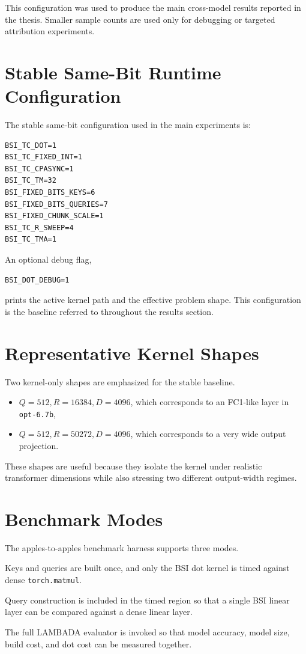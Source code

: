 This configuration was used to produce the main cross-model results reported in the thesis. Smaller sample counts are used only for debugging or targeted attribution experiments.

\section{Stable Same-Bit Runtime Configuration}
The stable same-bit configuration used in the main experiments is:

\begin{verbatim}
BSI_TC_DOT=1
BSI_TC_FIXED_INT=1
BSI_TC_CPASYNC=1
BSI_TC_TM=32
BSI_FIXED_BITS_KEYS=6
BSI_FIXED_BITS_QUERIES=7
BSI_FIXED_CHUNK_SCALE=1
BSI_TC_R_SWEEP=4
BSI_TC_TMA=1
\end{verbatim}

An optional debug flag,

\begin{verbatim}
BSI_DOT_DEBUG=1
\end{verbatim}

prints the active kernel path and the effective problem shape. This configuration is the baseline referred to throughout the results section.

\section{Representative Kernel Shapes}
Two kernel-only shapes are emphasized for the stable baseline.

\begin{itemize}[leftmargin=2em]
\item \(Q=512, R=16384, D=4096\), which corresponds to an FC1-like layer in \texttt{opt-6.7b},
\item \(Q=512, R=50272, D=4096\), which corresponds to a very wide output projection.
\end{itemize}

These shapes are useful because they isolate the kernel under realistic transformer dimensions while also stressing two different output-width regimes.

\section{Benchmark Modes}
The apples-to-apples benchmark harness supports three modes.

\begin{description}[leftmargin=2em,style=nextline]
\item[\texttt{kernel\_only}] Keys and queries are built once, and only the BSI dot kernel is timed against dense \texttt{torch.matmul}.
\item[\texttt{linear\_e2e}] Query construction is included in the timed region so that a single BSI linear layer can be compared against a dense linear layer.
\item[\texttt{model\_e2e}] The full LAMBADA evaluator is invoked so that model accuracy, model size, build cost, and dot cost can be measured together.
\end{description}

